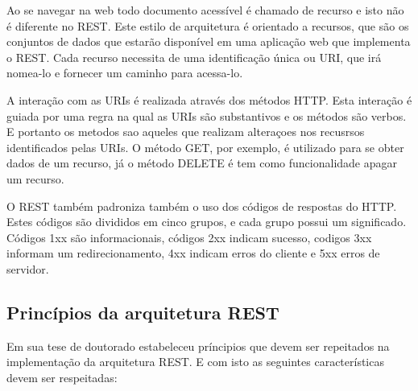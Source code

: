 \documentclass[
	12pt,				%
	openright,			%
	oneside,			%
	a4paper,			%
	english,			%
	french,				%
	spanish,			%
	brazil				%
	]{abntex2}
\begin{document}
Ao se navegar na web todo documento acessível é chamado de recurso e isto não é diferente no REST. Este estilo de arquitetura é orientado a recursos, que são os conjuntos de dados que estarão disponível em uma aplicação web que implementa o REST. Cada recurso necessita de uma identificação única ou URI, que irá nomea-lo e fornecer um caminho para acessa-lo.

A interação com as URIs é realizada através dos métodos HTTP. Esta interação é guiada por uma regra na qual as URIs são substantivos e os métodos são verbos. E portanto os metodos sao aqueles que realizam alteraçoes nos recusrsos identificados pelas URIs. O método GET, por exemplo, é utilizado para se obter dados de um recurso, já o método DELETE é tem como funcionalidade apagar um recurso. 

O REST também padroniza também o uso dos códigos de respostas do HTTP. Estes códigos são divididos em cinco grupos, e cada grupo possui um significado. Códigos 1xx são informacionais, códigos 2xx indicam sucesso, codigos 3xx informam um redirecionamento, 4xx indicam erros do cliente e 5xx erros de servidor.

\subsection{Princípios da arquitetura REST}

Em sua tese de doutorado  estabeleceu príncipios que devem ser repeitados na implementação da arquitetura REST. E com isto as seguintes características devem ser respeitadas:
\end{document}
